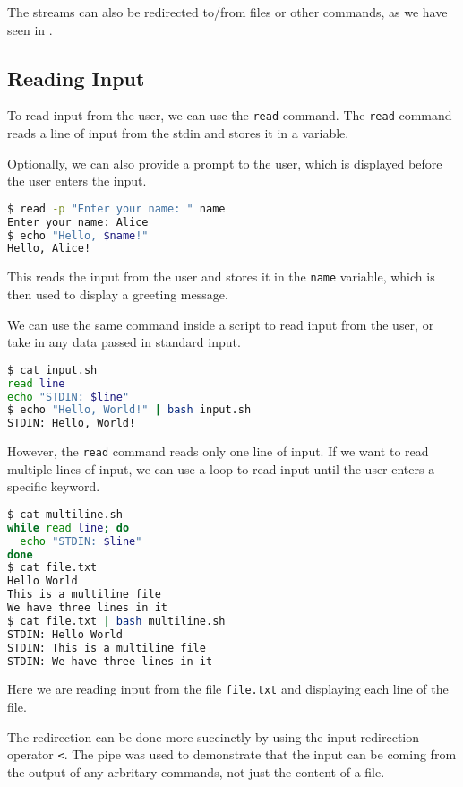 The streams can also be redirected to/from files or other commands, as we have seen in .

\subsection{Reading Input}

To read input from the user, we can use the \lstinline{read} command. The \lstinline{read} command reads a line of input from the stdin and stores it in a variable.

Optionally, we can also provide a prompt to the user, which is displayed before the user enters the input.

\begin{lstlisting}[language=bash]
$ read -p "Enter your name: " name
Enter your name: Alice
$ echo "Hello, $name!"
Hello, Alice!
\end{lstlisting}

This reads the input from the user and stores it in the \lstinline{name} variable, which is then used to display a greeting message.

We can use the same command inside a script to read input from the user, or take in any data passed in standard input.

\begin{lstlisting}[language=bash]
$ cat input.sh
read line
echo "STDIN: $line"
$ echo "Hello, World!" | bash input.sh
STDIN: Hello, World!
\end{lstlisting}

However, the \lstinline{read} command reads only one line of input. If we want to read multiple lines of input, we can use a loop to read input until the user enters a specific keyword.

\begin{lstlisting}[language=bash]
$ cat multiline.sh
while read line; do
  echo "STDIN: $line"
done
$ cat file.txt
Hello World
This is a multiline file
We have three lines in it
$ cat file.txt | bash multiline.sh
STDIN: Hello World
STDIN: This is a multiline file
STDIN: We have three lines in it
\end{lstlisting}

Here we are reading input from the file \lstinline{file.txt} and displaying each line of the file.

The redirection can be done more succinctly by using the input redirection operator \lstinline{<}. The pipe was used to demonstrate that the input can be coming from the output of any arbritary commands, not just the content of a file.

